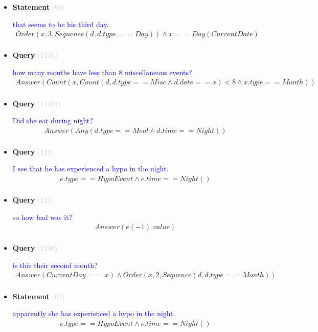 \documentclass[11pt]{article}
\newcommand{\key}[1]{\textcolor{lightgray}{#1}}
\newcounter{CQuery}
\newcounter{CStatement}
\begin{document}
\begin{itemize}
\item
\textbf{Statement\theCStatement} \key{(00)} \addtocounter{CStatement}{1}
\textcolor{blue}{ that seems to be his third day. }
\begin{multline*}
Order(x, 3, Sequence(d, d.type==Day)) \wedge x==Day(CurrentDate) \\ 
\end{multline*}


\item
\textbf{Query\theCQuery} \key{(1101)} \addtocounter{CQuery}{1}
\textcolor{blue}{ how many months have less than 8 miscellaneous events? }
\begin{multline*}
Answer(Count(x, Count(d, d.type==Misc \wedge d.date==x)<8 \wedge x.type==Month)) \\ 
\end{multline*}


\item
\textbf{Query\theCQuery} \key{(11101)} \addtocounter{CQuery}{1}
\textcolor{blue}{ Did she eat during night? }
\begin{multline*}
Answer(Any(d.type==Meal \wedge d.time==Night)) \\ 
\end{multline*}


\item
\textbf{Query\theCQuery} \key{(121)} \addtocounter{CQuery}{1}
\textcolor{blue}{ I see that he has experienced a hypo in the night. }
\begin{multline*}
e.type==HypoEvent \wedge e.time==Night() \\ 
\end{multline*}


\item
\textbf{Query\theCQuery} \key{(121)} \addtocounter{CQuery}{1}
\textcolor{blue}{ so how bad was it? }
\begin{multline*}
Answer(e(-1).value) \\ 
\end{multline*}


\item
\textbf{Query\theCQuery} \key{(1100)} \addtocounter{CQuery}{1}
\textcolor{blue}{ is this their second month? }
\begin{multline*}
Answer(CurrentDay==x) \wedge Order(x, 2, Sequence(d, d.type==Month)) \\ 
\end{multline*}


\item
\textbf{Statement\theCStatement} \key{(01)} \addtocounter{CStatement}{1}
\textcolor{blue}{ apparently she has experienced a hypo in the night. }
\begin{multline*}
e.type==HypoEvent \wedge e.time==Night() \\ 
\end{multline*}



\end{itemize}
\end{document}
